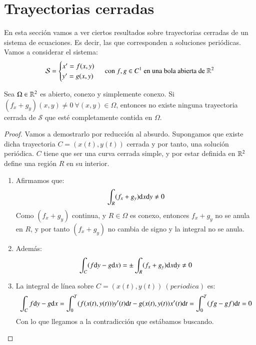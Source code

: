 \section{Trayectorias cerradas}
En esta sección vamos a ver ciertos resultados sobre trayectorias cerradas de un sistema de ecuaciones. Es decir, las que corresponden a soluciones periódicas. Vamos a considerar el sistema:
$$
    \mathcal{S} =
    \begin{cases}
        x' = f(x, y)\\
        y' = g(x, y)
    \end{cases} \text{ con } f, g \in C^1 \text{ en una bola abierta de } \mathbb{R}^2
$$
\begin{pro}\label{pro:bendixson}
    Sea $\Omega \in \mathbb{R}^2$ es abierto, conexo y simplemente conexo. Si $(f_x + g_y)(x, y) \neq 0\ \forall (x, y) \in \Omega$, entonces no existe ninguna trayectoria cerrada de $\mathcal{S}$ que esté completamente contida en $\Omega$.
\end{pro}
\begin{proof}
    Vamos a demostrarlo por reducción al absurdo. Supongamos que existe dicha trayectoria $C = (x(t), y(t))$ cerrada y por tanto, una solución periódica. $C$ tiene que ser una curva cerrada simple, y por estar definida en $\mathbb{R}^2$ define una región $R$ en su interior.
    \begin{enumerate}
        \item Afirmamos que:
            $$
                \int_R (f_x + g_y) \mathrm{d} x \mathrm{d} y \neq 0
            $$
            Como $(f_x + g_y)$ continua, y $R\in \Omega$ es conexo, entonces $f_x + g_y$ no se anula en $R$, y por tanto $(f_x + g_y)$ no cambia de signo y la integral no se anula.
        \item Además:
            $$
                \int_C (f \mathrm{d} y - g \mathrm{d} x) = \pm \int_R (f_x + g_y) \mathrm{d} x \mathrm{d} y \neq 0
            $$
        \item La integral de línea sobre $C = (x(t), y(t))\ (periodica)$ es:
            $$
                \int_C f \mathrm{d} y - g \mathrm{d} x = \int_0^T (f(x(t), y(t))) y'(t) \mathrm{d} t - g(x(t), y(t)) x'(t) \mathrm{d} t = \int_0^T (fg - gf) \mathrm{d} t = 0
            $$
            Con lo que llegamos a la contradicción que estábamos buscando.
    \end{enumerate}
\end{proof}
